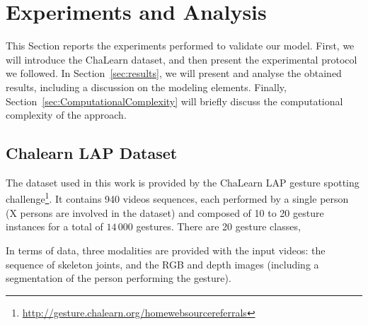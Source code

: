 

\section{Experiments and Analysis}

This Section reports the experiments performed to validate our model.
First, we will introduce the ChaLearn dataset, and then present the experimental protocol we followed.
In Section~\ref{sec:results}, we will present and analyse the obtained results, including a discussion
on the modeling elements.
Finally, Section~\ref{sec:ComputationalComplexity} will briefly discuss the computational complexity of the approach.



\subsection{Chalearn LAP Dataset}
\label{sec:chalearn}


The dataset used in this work is provided by the ChaLearn LAP \cite{chalearnLAP} gesture spotting challenge\footnote{\href{http://gesture.chalearn.org/homewebsourcereferrals}{http://gesture.chalearn.org/homewebsourcereferrals}}.
%
It contains 940 videos sequences, each performed by a single person (X persons are involved in the dataset)
and composed of 10 to 20 gesture instances for a total of $14\,000$ gestures.
%
There are 20 gesture classes,

In terms of data, three modalities are provided with the input videos: the sequence of skeleton joints, and the RGB and depth images
(including a segmentation of the person performing the gesture).




